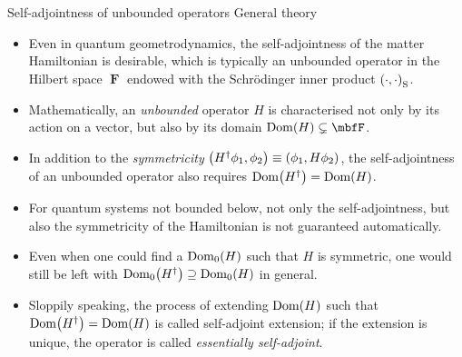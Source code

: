 \documentclass[8pt]{beamer}
\begin{document}
\begin{frame}%
{Self-adjointness of unbounded operators}%
{General theory}
\begin{itemize}
\item Even in quantum geometrodynamics, the self-adjointness of the matter
Hamiltonian is desirable,
which is typically an unbounded operator in the Hilbert space $\mbfF$ endowed
with the Schr\"odinger inner product ${\left(\cdot,\cdot\right)}_\text{S}$.

\item Mathematically, an \emph{unbounded} operator
$H$ is characterised not only by its action on a vector, but also by its domain
$\rfun{\mathrm{Dom}}{H} \subsetneq \mbfF$.

\item In addition to the \emph{symmetricity} ${\left(H^\dagger \phi_1, \phi_2\right)}
\equiv {\left(\phi_1, H \phi_2\right)}$, the self-adjointness of an unbounded operator
also requires ${\mathrm{Dom}}\mathopen{}\left(H^\dagger\right)\mathclose{} = {\mathrm{Dom}}\mathopen{}\left(H\right)\mathclose{}$.

\item For quantum systems not bounded below, not only the self-adjointness, but
also the symmetricity of the Hamiltonian is not guaranteed automatically.

\item Even when one could find a ${\mathrm{Dom}_0}\mathopen{}\left(H\right)\mathclose{}$ such that $H$ is
symmetric, one would still be left with ${\mathrm{Dom}_0}\mathopen{}\left(H^\dagger\right)\mathclose{}
\supseteq {\mathrm{Dom}_0}\mathopen{}\left(H\right)\mathclose{}$ in general.

\item Sloppily speaking, the process of extending ${\mathrm{Dom}}\mathopen{}\left(H\right)\mathclose{}$ such
that ${\mathrm{Dom}}\mathopen{}\left(H^\dagger\right)\mathclose{} = {\mathrm{Dom}}\mathopen{}\left(H\right)\mathclose{}$ is called
\alert{self-adjoint extension}; if the extension is unique, the operator is called
\emph{essentially self-adjoint}.

\end{itemize}
\end{frame}


\end{document}
